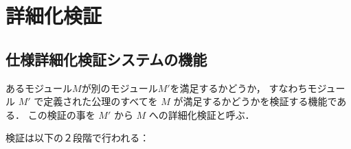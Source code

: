 \newpage
\chapter{詳細化検証}
\label{sec:spec-check-system}

\section{仕様詳細化検証システムの機能}
\label{sec:spec-check-function}

あるモジュール$M$が別のモジュール$M'$を満足するかどうか，
すなわちモジュール $M'$ で定義された公理のすべてを
$M$ が満足するかどうかを検証する機能である．
この検証の事を $M'$ から $M$ への詳細化検証と呼ぶ．

検証は以下の２段階で行われる：
